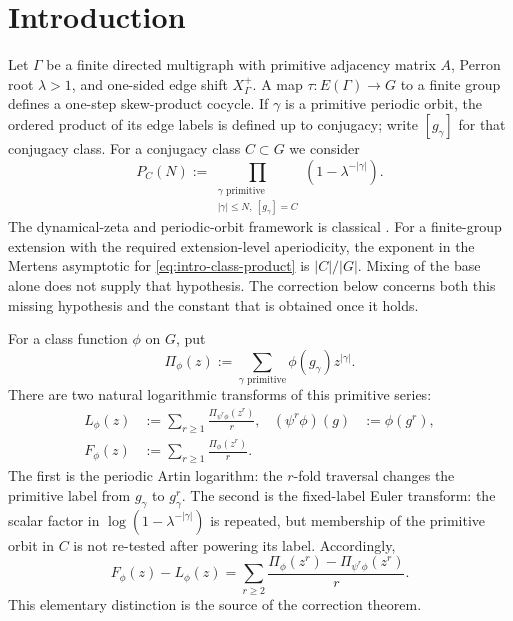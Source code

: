\section{Introduction}\label{sec:introduction}

Let \(\Gamma\) be a finite directed multigraph with primitive adjacency
matrix \(A\), Perron root \(\lambda>1\), and one-sided edge shift
\(X_\Gamma^+\).  A map \(\tau:E(\Gamma)\to G\) to a finite group defines a
one-step skew-product cocycle.  If \(\gamma\) is a primitive periodic orbit,
the ordered product of its edge labels is defined up to conjugacy; write
\([g_\gamma]\) for that conjugacy class.  For a conjugacy class \(C\subset G\)
we consider
\begin{equation}\label{eq:intro-class-product}
  P_C(N):=
  \prod_{\substack{\gamma\text{ primitive}\\
                    |\gamma|\leq N,\ [g_\gamma]=C}}
       \left(1-\lambda^{-|\gamma|}\right).
\end{equation}
The dynamical-zeta and periodic-orbit framework is classical
\cite{BowenLanford1970Zeta,Parry1983PrimeOrbit,ParryPollicott1990Zeta}.
For a finite-group extension with the required extension-level aperiodicity,
the exponent in the Mertens asymptotic for \eqref{eq:intro-class-product} is
\(|C|/|G|\).  Mixing of the base alone does not supply that hypothesis.  The
correction below concerns both this missing hypothesis and the constant that
is obtained once it holds.

For a class function \(\phi\) on \(G\), put
\[
  \Pi_\phi(z):=\sum_{\gamma\text{ primitive}}
     \phi(g_\gamma)z^{|\gamma|}.
\]
There are two natural logarithmic transforms of this primitive series:
\begin{align}
  L_\phi(z)
    &:=\sum_{r\geq1}\frac{\Pi_{\psi^r\phi}(z^r)}{r},
    & (\psi^r\phi)(g)&:=\phi(g^r),
    \label{eq:intro-artin}\\
  F_\phi(z)
    &:=\sum_{r\geq1}\frac{\Pi_\phi(z^r)}{r}.
    \label{eq:intro-fixed}
\end{align}
The first is the periodic Artin logarithm: the \(r\)-fold traversal changes
the primitive label from \(g_\gamma\) to \(g_\gamma^r\).  The second is the
fixed-label Euler transform: the scalar factor in
\(\log(1-\lambda^{-|\gamma|})\) is repeated, but membership of the primitive
orbit in \(C\) is not re-tested after powering its label.  Accordingly,
\begin{equation}\label{eq:intro-difference}
  F_\phi(z)-L_\phi(z)
  =\sum_{r\geq2}\frac{
       \Pi_\phi(z^r)-\Pi_{\psi^r\phi}(z^r)}{r}.
\end{equation}
This elementary distinction is the source of the correction theorem.

